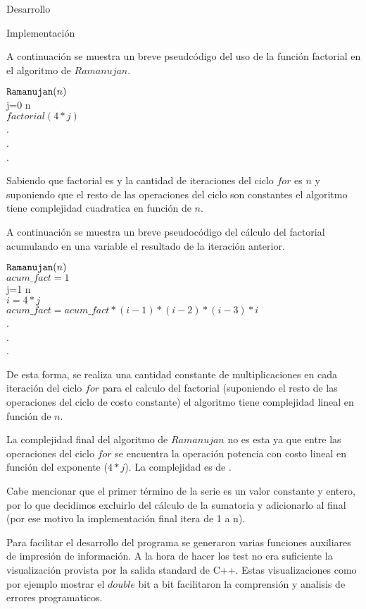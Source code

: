 \begin{section}{Desarrollo}
\begin{subsection}{Implementación}
\begin{itemize}
		A continuación se muestra un breve pseudcódigo del uso de la función factorial en el algoritmo de $Ramanujan$.
		
		$\texttt{Ramanujan}(n)$\\
		\tab\FOR j=0 \TO n\\
		\tab\tab$factorial(4*j)$\\
		\tab\tab\tab.\\
		\tab\tab\tab.\\
		\tab\tab\tab.\\
		\tab\END
		
		\VSP
		
		Sabiendo que factorial es  y la cantidad de iteraciones del ciclo $for$ es $n$ y suponiendo que el resto de las operaciones del ciclo son constantes el algoritmo tiene complejidad cuadratica en función de $n$.\VSP

		A continuación se muestra un breve pseudocódigo del cálculo del factorial acumulando en una variable el resultado de la iteración anterior.\VSP
		
		$\texttt{Ramanujan}(n)$\\
		\tab $acum\_fact=1$\\
		\tab\FOR j=1 \TO n\\
		\tab\tab $i = 4*j$\\
		\tab\tab$acum\_fact = acum\_fact*(i-1)*(i-2)*(i-3)*i$\\
		\tab\tab\tab.\\
		\tab\tab\tab.\\
		\tab\tab\tab.\\
		\tab\END
		
		\VSP
		
		De esta forma, se realiza una cantidad constante de multiplicaciones en cada iteración del ciclo $for$ para el calculo del factorial (suponiendo el resto de las operaciones del ciclo de costo constante) el algoritmo tiene complejidad lineal en función de $n$.
		
		La complejidad final del algoritmo de $Ramanujan$ no es esta ya que entre las operaciones del ciclo $for$ se encuentra la operación potencia con costo lineal en función del exponente ($4*j$). La complejidad es de .
		
		Cabe mencionar que el primer término de la serie es un valor constante y entero, por lo que decidimos excluirlo del cálculo de la sumatoria y adicionarlo al final (por ese motivo la implementación final itera de 1 a n).
		\end{itemize}
		
		Para facilitar el desarrollo del programa se generaron varias funciones auxiliares de impresión de información. A la hora de hacer los test no era suficiente la visualización provista por la salida standard de C++. Estas visualizaciones como por ejemplo mostrar el $double$ bit a bit facilitaron la comprensión y analisis de errores programaticos.
		
	\end{subsection}
\end{section}
